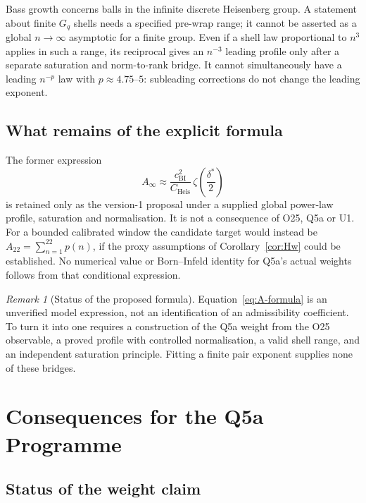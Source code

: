 \documentclass[12pt]{article}
\theoremstyle{definition}
\theoremstyle{remark}
\newtheorem{remark}[theorem]{Remark}
\DeclareMathOperator{\Heis}{Heis}
\begin{document}
  Bass growth concerns balls in the infinite discrete Heisenberg group.
  A statement about finite $G_q$ shells needs a specified pre-wrap range;
  it cannot be asserted as a global $n\to\infty$ asymptotic for a finite
  group.
  Even if a shell law proportional to $n^3$ applies in such a range,
  its reciprocal gives an $n^{-3}$ leading profile only after a separate
  saturation and norm-to-rank bridge.
  It cannot simultaneously have a leading $n^{-p}$ law with
  $p\approx4.75$--$5$: subleading corrections do not change the
  leading exponent.

  \subsection{What remains of the explicit formula}

  The former expression
  \begin{equation}
    \label{eq:A-formula}
    A_\infty\approx
    \frac{c_{\mathrm{BI}}^2}{C_{\Heis}}\,
    \zeta\!\left(\frac{\delta^*}{2}\right)
  \end{equation}
  is retained only as the version-1 proposal under a supplied global
  power-law profile, saturation and normalisation.
  It is not a consequence of O25, Q5a or U1.
  For a bounded calibrated window the candidate target would instead be
  $A_{22}=\sum_{n=1}^{22}p(n)$, if the proxy assumptions of
  Corollary~\ref{cor:Hw} could be established.
  No numerical value or Born--Infeld identity for Q5a's actual weights
  follows from that conditional expression.

  \begin{remark}[Status of the proposed formula]
    \label{rem:formula}
    Equation~\eqref{eq:A-formula} is an unverified model expression, not
    an identification of an admissibility coefficient.
    To turn it into one requires a construction of the Q5a weight from
    the O25 observable, a proved profile with controlled normalisation,
    a valid shell range, and an independent saturation principle.
    Fitting a finite pair exponent supplies none of these bridges.
  \end{remark}

  \section{Consequences for the Q5a Programme}
  \label{sec:consequences}

  \subsection{Status of the weight claim}
\end{document}
